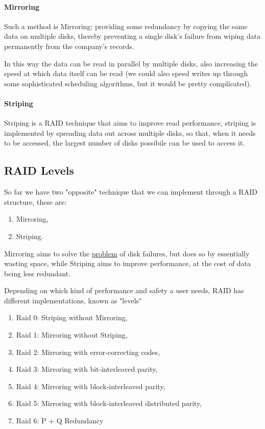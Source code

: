 \documentclass[openright, twoside]{report}
\theoremstyle{definition}
\theoremstyle{example}
\begin{document}
\paragraph{Mirroring}
Such a method is Mirroring: 
providing some redundancy by copying the same data on multiple disks,
thereby preventing a single disk's failure from wiping data permanently 
from the company's records.

In this way the data can be read in parallel by multiple disks, also increasing 
the speed at which data itself can be read (we could also speed writes up through 
some sophisticated scheduling algorithms, but it would be pretty complicated).

\paragraph{Striping}
Striping is a RAID technique that aims to improve read performance, striping is 
implemented by spreading data out across multiple disks, so that, when it needs to 
be accessed, the largest number of disks possibile can be used to access it.

\subsection{RAID Levels}
So far we have two "opposite" technique that we can implement through a RAID structure, 
these are:

\begin{enumerate}
	\item Mirroring,
	\item Striping.
\end{enumerate}

Mirroring aims to solve the \hyperref[fig:fails]{problem} of disk failures, but does so 
by essentially wasting space, while Striping aims to improve performance, at the cost of 
data being less redundant. 

Depending on which kind of performance and safety a user needs, RAID has different implementations,
known as "levels"

\begin{enumerate}
	\item Raid 0: Striping without Mirroring,
	\item Raid 1: Mirroring without Striping,
	\item Raid 2: Mirroring with error-correcting codes,
	\item Raid 3: Mirroring with bit-interleaved parity,
	\item Raid 4: Mirroring with block-interleaved parity,
	\item Raid 5: Mirroring with block-interleaved distributed parity,
	\item Raid 6: P + Q Redundancy
\end{enumerate}
\end{document}
